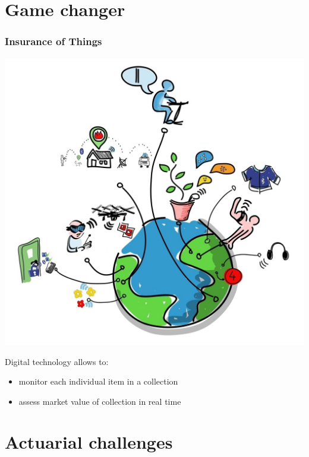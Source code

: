 \section{Game changer}

\begin{frame}
  \frametitle{Insurance of Things}

  \begin{minipage}{0.48\linewidth}
    \includegraphics[width=\linewidth]{Internet_of_Things}
  \end{minipage}
  \hfill
  \begin{minipage}{0.48\linewidth}
    Digital technology allows to:
    \begin{itemize}
    \item monitor each individual item in a collection
    \item assess market value of collection in real time
    \end{itemize}
  \end{minipage}
\end{frame}

\section{Actuarial challenges}

